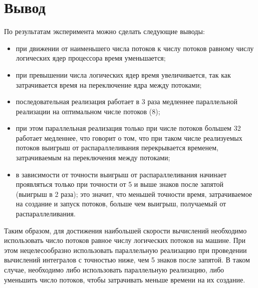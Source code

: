 
\clearpage
\section{Вывод}

По результатам эксперимента можно сделать следующие выводы:
\begin{itemize}[left=\parindent]
    \item при движении от наименьшего числа потоков к числу потоков равному
        числу логических ядер процессора время уменьшается;
    \item при превышении числа логических ядер время увеличивается, так как
        затрачивается время на переключение ядра между потоками;
    \item последовательная реализация работает  в 3 раза медленнее
        параллельной реализации на оптимальном числе потоков (8);
    \item при этом параллельная реализация только при числе потоков большем 32
        работает медленнее, что говорит о том, что при таком числе реализуемых
        потоков выигрыш от распараллеливания перекрывается временем,
        затрачиваемым на переключения между потоками;
    \item в зависимости от точности выигрыш от распараллеливания начинает
        проявляться только при точности от 5 и выше знаков после запятой
        (выигрыш  в 2 раза); это значит, что меньшей точности время,
        затрачиваемое на создание и запуск потоков, больше чем выигрыш,
        получаемый от распараллеливания.
\end{itemize}

Таким образом, для достижения наибольшей скорости вычислений необходимо
использовать число потоков равное числу логических потоков на машине. При этом
нецелесообразно использовать параллельную реализацию при проведении вычислений
интегралов с точностью ниже, чем 5 знаков после запятой. В таком случае,
необходимо либо использовать параллельную реализацию, либо уменьшить число
потоков, чтобы затрачивать меньше времени на их создание.
